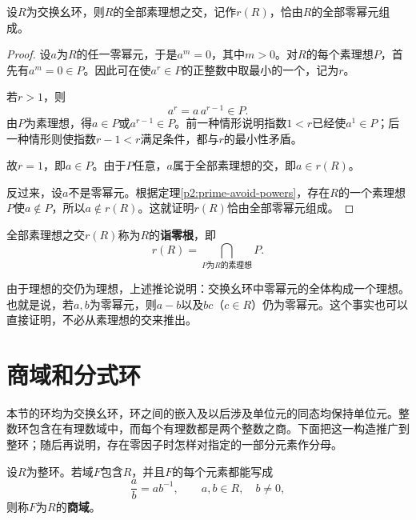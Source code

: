 \begin{corollary}
设$R$为交换幺环，则$R$的全部素理想之交，记作$r(R)$，恰由$R$的全部零幂元组成。
\end{corollary}
\begin{proof}
设$a$为$R$的任一零幂元，于是$a^m=0$，其中$m>0$。对$R$的每个素理想$P$，首先有$a^m=0\in P$。因此可在使$a^r\in P$的正整数中取最小的一个，记为$r$。

若$r>1$，则
\[
a^r=a\,a^{r-1}\in P.
\]
由$P$为素理想，得$a\in P$或$a^{r-1}\in P$。前一种情形说明指数$1<r$已经使$a^1\in P$；后一种情形则使指数$r-1<r$满足条件，都与$r$的最小性矛盾。

故$r=1$，即$a\in P$。由于$P$任意，$a$属于全部素理想的交，即$a\in r(R)$。

反过来，设$a$不是零幂元。根据定理\ref{p2:prime-avoid-powers}，存在$R$的一个素理想$P$使$a\notin P$，所以$a\notin r(R)$。这就证明$r(R)$恰由全部零幂元组成。
\end{proof}

\begin{definition}
全部素理想之交$r(R)$称为$R$的\textbf{诣零根}，即
\[
r(R)=\bigcap_{P\text{为}R\text{的素理想}}P.
\]
\end{definition}

由于理想的交仍为理想，上述推论说明：交换幺环中零幂元的全体构成一个理想。也就是说，若$a,b$为零幂元，则$a-b$以及$bc$（$c\in R$）仍为零幂元。这个事实也可以直接证明，不必从素理想的交来推出。




\section{商域和分式环}

本节的环均为交换幺环，环之间的嵌入及以后涉及单位元的同态均保持单位元。整数环包含在有理数域中，而每个有理数都是两个整数之商。下面把这一构造推广到整环；随后再说明，存在零因子时怎样对指定的一部分元素作分母。

\begin{definition}
设$R$为整环。若域$F$包含$R$，并且$F$的每个元素都能写成
\[
\frac ab=ab^{-1},\qquad a,b\in R,\quad b\ne0,
\]
则称$F$为$R$的\textbf{商域}。
\end{definition}

